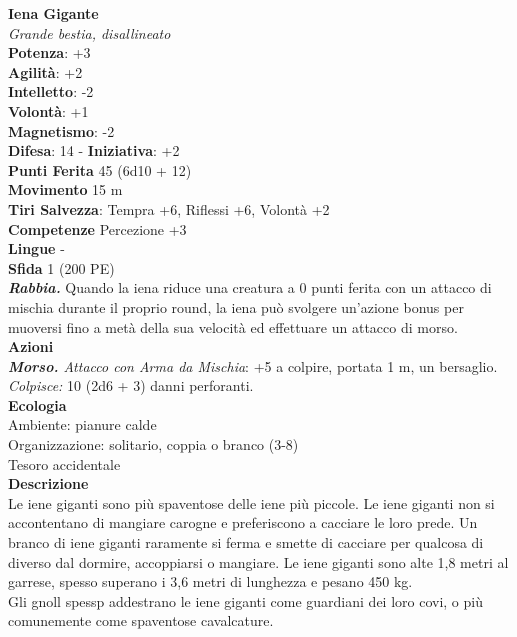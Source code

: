 \begin{multicols}{2}
\medskip\textbf{Iena Gigante}\\
\emph{Grande bestia, disallineato}\\
\textbf{Potenza}: +3\\
\textbf{Agilità}: +2\\
\textbf{Intelletto}: -2\\
\textbf{Volontà}: +1\\
\textbf{Magnetismo}: -2\\
\textbf{Difesa}: 14 - \textbf{Iniziativa}: +2\\
\textbf{Punti Ferita} 45 (6d10 + 12)\\
\textbf{Movimento} 15 m\\
\textbf{Tiri Salvezza}: Tempra +6, Riflessi +6, Volontà +2 \\
\textbf{Competenze} Percezione +3\\
\textbf{Lingue} -\\
\textbf{Sfida} 1 (200 PE)\smallskip\\
\emph{\textbf{Rabbia.}} Quando la iena riduce una creatura a 0 punti ferita con un attacco di mischia durante il proprio round, la iena può svolgere un'azione bonus per muoversi fino a metà della sua velocità ed effettuare un attacco di morso.\\
\smallskip\textbf{Azioni}\\
\emph{\textbf{Morso.} Attacco con Arma da Mischia}: +5 a colpire, portata 1 m, un bersaglio.\\
\emph{Colpisce:} 10 (2d6 + 3) danni perforanti.\\
\textbf{Ecologia}\\
Ambiente: pianure calde\\
Organizzazione: solitario, coppia o branco (3-8)\\
Tesoro accidentale\\
\textbf{Descrizione}\\
Le iene giganti sono più spaventose delle iene più piccole. Le iene giganti non si accontentano di mangiare carogne e preferiscono a cacciare le loro prede. Un branco di  iene giganti raramente si ferma e smette di cacciare per qualcosa di diverso dal dormire, accoppiarsi o mangiare. Le iene giganti sono alte 1,8 metri al garrese, spesso superano i 3,6 metri di lunghezza e pesano 450 kg.\\

Gli gnoll spessp addestrano le iene giganti come guardiani dei loro covi, o più comunemente come spaventose cavalcature.\\



\end{multicols}
